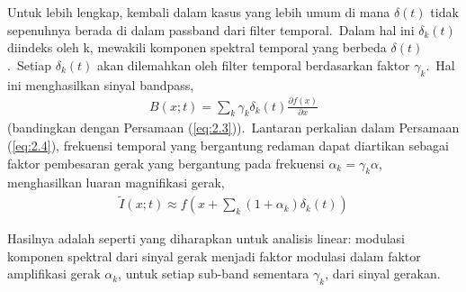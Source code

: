 Untuk lebih lengkap, kembali dalam kasus yang lebih umum di mana \(\delta (t)\) tidak sepenuhnya berada di dalam passband dari filter temporal.~Dalam hal ini \({\delta _k}(t)\) diindeks oleh k, mewakili komponen spektral temporal yang berbeda \(\delta (t)\).~Setiap \({\delta _k}(t)\) akan dilemahkan oleh filter temporal berdasarkan faktor \({\gamma _k}\).~Hal ini menghasilkan sinyal bandpass,
\begin{equation} \label{eq:2.7}
\begin{aligned}
B(x; t) = \sum\limits_k^{} {{\gamma _k}{\delta _k}(t)\frac{{\partial f(x)}}{{\partial x}}}
\end{aligned}
\end{equation}
%
(bandingkan dengan Persamaan (\ref{eq:2.3})).~Lantaran perkalian dalam Persamaan (\ref{eq:2.4}), frekuensi temporal yang bergantung redaman dapat diartikan sebagai faktor pembesaran gerak yang bergantung pada frekuensi \({\alpha _k} = {\gamma _k}\alpha\), menghasilkan luaran magnifikasi gerak,
\begin{equation} \label{eq:2.8}
\begin{aligned}
\tilde I(x;t) \approx f(x + \sum\limits_k {(1 + {\alpha _k})} {\delta _k}(t))
\end{aligned}
\end{equation}

Hasilnya adalah seperti yang diharapkan untuk analisis linear: modulasi komponen spektral dari sinyal gerak menjadi faktor modulasi dalam faktor amplifikasi gerak \(\alpha _k\), untuk setiap sub-band sementara \(\gamma _k\), dari sinyal gerakan.

